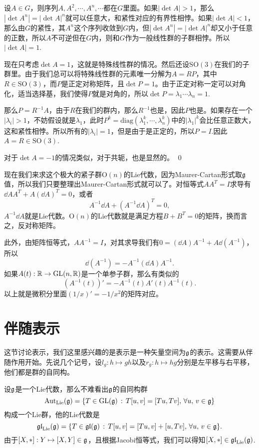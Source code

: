 \proof 设$A\in G$，则序列$A,A^2,\cdots,A^n,\cdots$都在$G$里面。如果$|\det A|>1$，那么$|\det A^n|=|\det A|^n$就可以任意大，和紧性对应的有界性相悖。如果$|\det A|<1$，那么由$G$的紧性，其$A^n$这个序列收敛到$G$内，但$|\det A^n|=|\det A|^n$却又小于任意的正数，所以$A$不可逆但在$G$内，则和$G$作为一般线性群的子群相悖。所以$|\det A|=1$.

现在只考虑$\det A=1$，这就是特殊线性群的情况。然后还设$\mathrm{SO}(3)$在我们的子群里。由于我们总可以将特殊线性群的元素唯一分解为$A=RP$，其中$R\in \mathrm{SO}(3)$，而$P$是正定对称矩阵，且$\det P=1$。由于正定对称一定可以对角化，适当选择基，我们使得$P$就是对角的，所以$\det P=\lambda_1\cdots\lambda_n=1$.

那么$P=R^{-1}A$，由于$R$在我们的群内，那么$R^{-1}$也是，因此$P$也是。如果存在一个$|\lambda_i|>1$，不妨假设就是$\lambda_1$，此时$P^{k}=\mathrm{diag}(\lambda_1^k,\cdots,\lambda_n^k)$中的$|\lambda_1|^k$会比任意正数大，这和紧性相悖。所以所有的$|\lambda_i|=1$，但是由于是正定的，所以$P=I$.因此$A=R\in\mathrm{SO}(3)$.

对于$\det A=-1$的情况类似，对于共轭，也是显然的。 \qed

现在我们来求这个极大的紧子群$\mathrm{O}(n)$的Lie代数，因为Maurer-Cartan形式取${\mathfrak{g}}$值，所以我们只要整理出Maurer-Cartan形式就可以了。对恒等式$AA^T=I$求导有$\dd A A^T+A(\dd A)^T=0$，或者
\[
	A^{-1}\dd A+(A^{-1}\dd A)^T=0,
\]
$A^{-1}\dd A$就是Lie代数。$\mathrm{O}(n)$的Lie代数就是满足方程$B+B^T=0$的矩阵，换而言之，反对称矩阵。

此外，由矩阵恒等式，$AA^{-1}=I$，对其求导我们有$0=(\dd A) A^{-1}+A\dd(A^{-1})$，所以
\[
	\dd(A^{-1})=-A^{-1}(\dd A) A^{-1}.
\]
如果$A(t):\mathbb{R} \to \mathrm{GL}(n,\mathbb{R})$是一个单参子群，那么有类似的
\[
	(A^{-1}(t))'=-A^{-1}(t)A'(t) A^{-1}(t).
\]
以上就是微积分里面$(1/x)'=-1/x^2$的矩阵对应。

\section{伴随表示}

这节讨论表示，我们这里感兴趣的是表示是一种矢量空间为${\mathfrak{g}}$的表示。这需要从伴随作用开始。先说几个记号，设$l_g:h\mapsto gh$以及$r_g:h\mapsto hg$分别是左平移与右平移，他们都是群的自同构。

\para 设${\mathfrak{g}}$是一个Lie代数，那么不难看出${\mathfrak{g}}$的自同构群
\[\mathrm{Aut}_{\mathrm{Lie}}({\mathfrak{g}})=\{T\in \mathrm{GL}({\mathfrak{g}})\,:\,T[u,v]=[Tu,Tv],\,\forall u,\,v\in{\mathfrak{g}}\}\]
构成一个Lie群，他的Lie代数是
\[\mathfrak{gl}_{\mathrm{Lie}}({\mathfrak{g}})=\{T\in \mathfrak{gl}({\mathfrak{g}})\,:\,T[u,v]=[Tu,v]+[u,Tv],\,\forall u,\,v\in{\mathfrak{g}}\}.\]
由于$[X,*]:Y\mapsto [X,Y]\in {\mathfrak{g}}$，且根据Jacobi恒等式，我们可以得知$[X,*]\in \mathfrak{gl}_{\mathrm{Lie}}({\mathfrak{g}})$.

